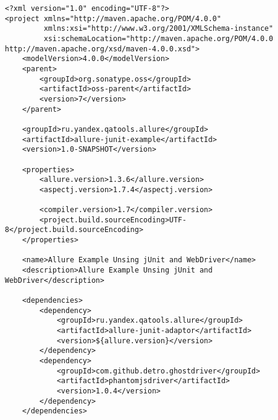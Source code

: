 \begin{lstlisting}[style=XML, caption=Пример подключения Allure к JUnit тестам с использованием Maven]
<?xml version="1.0" encoding="UTF-8"?>
<project xmlns="http://maven.apache.org/POM/4.0.0"
         xmlns:xsi="http://www.w3.org/2001/XMLSchema-instance"
         xsi:schemaLocation="http://maven.apache.org/POM/4.0.0 http://maven.apache.org/xsd/maven-4.0.0.xsd">
    <modelVersion>4.0.0</modelVersion>
    <parent>
        <groupId>org.sonatype.oss</groupId>
        <artifactId>oss-parent</artifactId>
        <version>7</version>
    </parent>

    <groupId>ru.yandex.qatools.allure</groupId>
    <artifactId>allure-junit-example</artifactId>
    <version>1.0-SNAPSHOT</version>

    <properties>
        <allure.version>1.3.6</allure.version>
        <aspectj.version>1.7.4</aspectj.version>

        <compiler.version>1.7</compiler.version>
        <project.build.sourceEncoding>UTF-8</project.build.sourceEncoding>
    </properties>

    <name>Allure Example Unsing jUnit and WebDriver</name>
    <description>Allure Example Unsing jUnit and WebDriver</description>

    <dependencies>
        <dependency>
            <groupId>ru.yandex.qatools.allure</groupId>
            <artifactId>allure-junit-adaptor</artifactId>
            <version>${allure.version}</version>
        </dependency>
        <dependency>
            <groupId>com.github.detro.ghostdriver</groupId>
            <artifactId>phantomjsdriver</artifactId>
            <version>1.0.4</version>
        </dependency>
    </dependencies>


\end{lstlisting}
